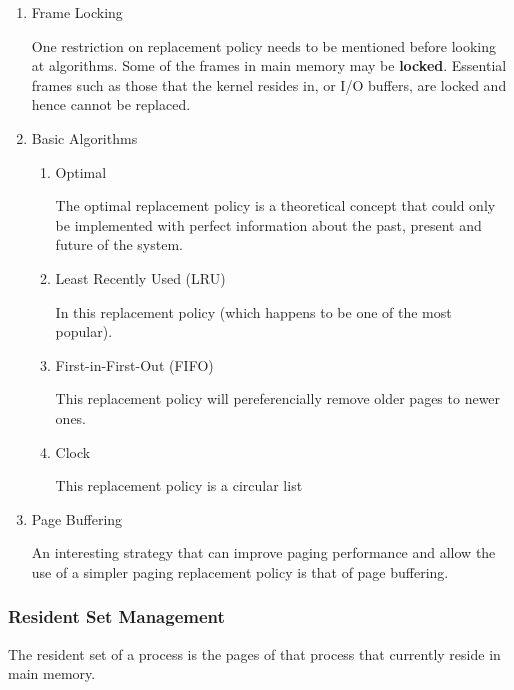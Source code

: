 \documentclass[11pt]{article}
\begin{document}
\begin{enumerate}
\item Frame Locking
\label{sec:orgheadline43}

One restriction on replacement policy needs to be mentioned
before looking at algorithms. Some of the frames in main memory
may be \textbf{locked}. Essential frames such as those that the kernel
resides in, or I/O buffers, are locked and hence cannot be
replaced.

\item Basic Algorithms
\label{sec:orgheadline48}

\begin{enumerate}
\item Optimal
\label{sec:orgheadline44}

The optimal replacement policy is a theoretical concept
that could only be implemented with perfect information
about the past, present and future of the system.

\item Least Recently Used (LRU)
\label{sec:orgheadline45}

In this replacement policy (which happens to be one of the
most popular).

\item First-in-First-Out (FIFO)
\label{sec:orgheadline46}

This replacement policy will pereferencially remove older
pages to newer ones.

\item Clock
\label{sec:orgheadline47}

This replacement policy is a circular list
\end{enumerate}

\item Page Buffering
\label{sec:orgheadline49}

An interesting strategy that can improve paging performance
and allow the use of a simpler paging replacement policy is
that of page buffering.
\end{enumerate}

\subsubsection{Resident Set Management}
\label{sec:orgheadline58}

The resident set of a process is the pages of that process that currently
reside in main memory.
\end{document}
